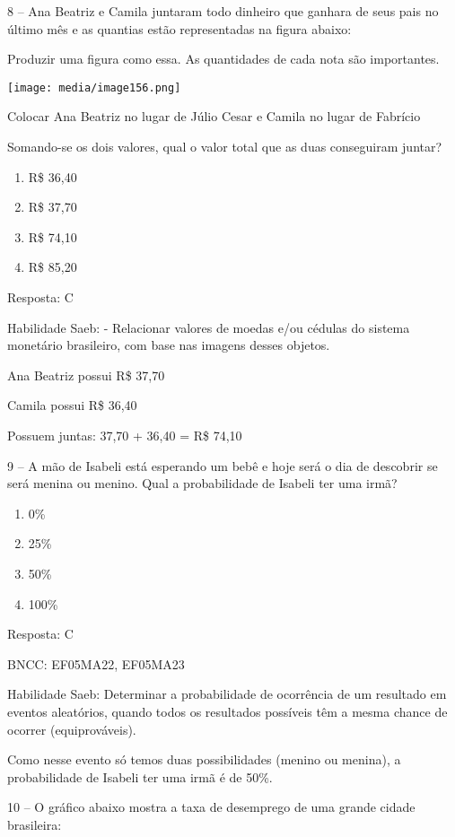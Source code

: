 8 -- Ana Beatriz e Camila juntaram todo dinheiro que ganhara de seus
pais no último mês e as quantias estão representadas na figura abaixo:

Produzir uma figura como essa. As quantidades de cada nota são
importantes.

\texttt{[image: media/image156.png]}

Colocar Ana Beatriz no lugar de Júlio Cesar e Camila no lugar de
Fabrício

Somando-se os dois valores, qual o valor total que as duas conseguiram
juntar?

\begin{enumerate}
\def\labelenumi{\alph{enumi})}
\item
  R\$ 36,40
\item
  R\$ 37,70
\item
  R\$ 74,10
\item
  R\$ 85,20
\end{enumerate}

Resposta: C

Habilidade Saeb: - Relacionar valores de moedas e/ou cédulas do sistema
monetário brasileiro, com base nas imagens desses objetos.

Ana Beatriz possui R\$ 37,70

Camila possui R\$ 36,40

Possuem juntas: 37,70 + 36,40 = R\$ 74,10

9 -- A mão de Isabeli está esperando um bebê e hoje será o dia de
descobrir se será menina ou menino. Qual a probabilidade de Isabeli ter
uma irmã?

\begin{enumerate}
\def\labelenumi{\alph{enumi})}
\item
  0\%
\item
  25\%
\item
  50\%
\item
  100\%
\end{enumerate}

Resposta: C

BNCC: EF05MA22, EF05MA23

Habilidade Saeb: Determinar a probabilidade de ocorrência de um
resultado em eventos aleatórios, quando todos os resultados possíveis
têm a mesma chance de ocorrer (equiprováveis).

Como nesse evento só temos duas possibilidades (menino ou menina), a
probabilidade de Isabeli ter uma irmã é de 50\%.

10 -- O gráfico abaixo mostra a taxa de desemprego de uma grande cidade
brasileira:

